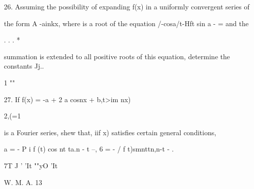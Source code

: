 
26. Assuming the possibility of expanding f(x) in a uniformly
convergent series of

the form A -ainkx, where is a root of the equation /-cosa/t-Hft sin a
- = and the

  . . . *

summation is extended to all positive roots of this equation,
determine the constants Jj..


1 ""

27. If f(x) = -a + 2 a cosnx + b,t>im nx)

2,(=1

is a Fourier series, shew that, iif x) satisfies certain general
conditions,

a = - P i f (t) cos nt ta.n - t --, 6 = - / f t)smnttn,n-t - .

7T J ' 'It ""yO 'It


W. M. A. 13
